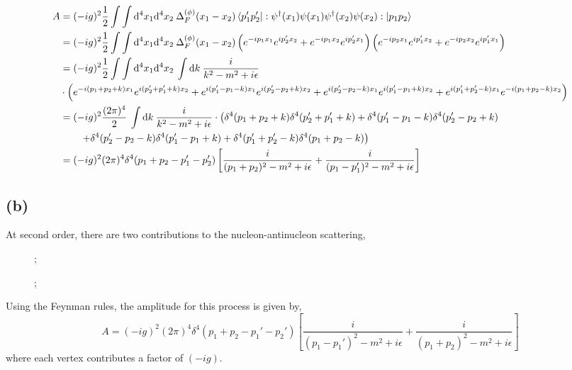 \documentclass[12pt]{extarticle}
\begin{document}
\begin{align*}
A & = (- ig)^2 \frac{1}{2} \int\int \mathrm{d}^4x_1 \mathrm{d}^4x_2 \: \Delta_F^{(\phi)}(x_1 - x_2) \left< p'_1 p'_2 \right| : \psi^\dagger(x_1) \psi(x_1) \psi^\dagger(x_2) \psi(x_2) :\left| p_1 p_2 \right>
\\
& = (- ig)^2 \frac{1}{2} \int\int \mathrm{d}^4x_1 \mathrm{d}^4x_2 \: \Delta_F^{(\phi)}(x_1 - x_2) \left(e^{- i p_1 x_1} e^{i p_2' x_2} + e^{- i p_1 x_2 } e^{i p_2' x_1} \right) \left( e^{- i p_2 x_1} e^{i p_1' x_2} + e^{- i p_2 x_2} e^{i p_1' x_1}  \right)
\\
& = (- ig)^2 \frac{1}{2} \int\int \mathrm{d}^4x_1 \mathrm{d}^4x_2 \: \int \mathrm{d}k \: \frac{i}{k^2 - m^2 + i \epsilon}  
\\
& \cdot \left( e^{-i (p_1 + p_2 + k) x_1} e^{i (p_2' + p_1' + k) x_2} + e^{i (p_1' - p_1 - k) x_1} e^{i (p_2' - p_2 + k) x_2} + e^{i (p_2' - p_2 - k) x_1} e^{i(p_1' - p_1 + k)x_2} + e^{i(p_1' + p_2' - k) x_1} e^{-i(p_1 + p_2 - k) x_2} \right)
\\
& = (- ig)^2 \frac{(2 \pi)^4}{2} \: \int \mathrm{d}k \: \frac{i}{k^2 - m^2 + i \epsilon}  \cdot \left( \delta^4(p_1 + p_2 + k) \delta^4(p_2' + p_1' + k) + \delta^4(p_1' - p_1 - k) \delta^4(p_2' - p_2 + k) \right. 
\\
& \quad \quad \left. + \delta^4(p_2' - p_2 - k) \delta^4(p_1' - p_1 + k) + \delta^4(p_1' + p_2' - k) \delta^4(p_1 + p_2 - k)  \right)
\\
& = (- ig)^2 (2 \pi)^4 \delta^4(p_1 + p_2 - p_1' - p_2') \left[ \frac{i}{(p_1 + p_2)^2 - m^2 + i \epsilon} + \frac{i}{(p_1 - p_1')^2 - m^2 + i \epsilon} \right]
\end{align*}

\subsection*{(b)}
At second order, there are two contributions to the nucleon-antinucleon scattering,
\begin{figure}
\centering
\begin{minipage}{.5\textwidth}
  \centering
  
;

\end{minipage}%
\begin{minipage}{.5\textwidth}
  \centering
  
;

\end{minipage}
\end{figure}
Using the Feynman rules, the amplitude for this process is given by,
\[ A = (- i g)^2 (2 \pi)^4 \delta^4(p_1 + p_2 - p_1' - p_2') \left[ \frac{i}{(p_1 - p_1')^2 - m^2 + i \epsilon} + \frac{i}{(p_1 + p_2)^2 - m^2 + i \epsilon} \right] \]
where each vertex contributes a factor of $(-ig)$. 
\end{document}
